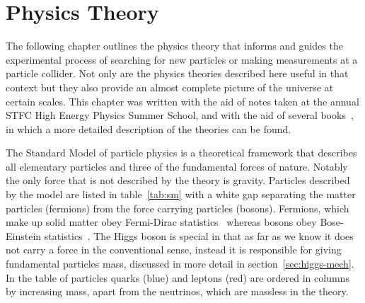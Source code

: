 \chapter{Physics Theory}%
\label{sec:theory}

The following chapter outlines the physics theory that informs and guides the
experimental process of searching for new particles or making measurements at
a particle collider. Not only are the physics theories described here useful in
that context but they also provide an almost complete picture of the universe at
certain scales. This chapter was written with the aid of notes taken at the
annual STFC High Energy Physics Summer School, and with the aid of several
books~\cite{halzen, thomson_2013}, in which a more detailed description of the
theories can be found.

The Standard Model of particle physics is a theoretical framework that describes
all elementary particles and three of the fundamental forces of nature. Notably
the only force that is not described by the theory is gravity. Particles
described by the model are listed in table~\ref{tab:sm} with a white gap
separating the matter particles (fermions) from the force carrying particles
(bosons). Fermions, which make up solid matter obey Fermi-Dirac
statistics~\cite{Fermi-stat, Dirac-stat} whereas bosons obey Bose-Einstein
statistics~\cite{Bose-Einstein}. The Higgs boson is special in that as far as we
know it does not carry a force in the conventional sense, instead it is
responsible for giving fundamental particles mass, discussed in more detail in
section~\ref{sec:higgs-mech}. In the table of particles quarks (blue) and
leptons (red) are ordered in columns by increasing mass, apart from the
neutrinos, which are massless in the theory.



